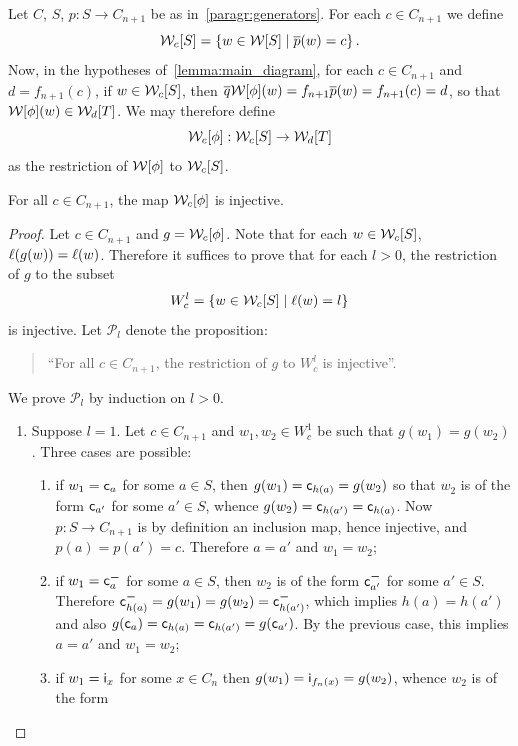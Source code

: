 \begin{paragr}\label{paragr:restricted_formulas}
  Let $C$, $S$, $p:S\to C_{n+1}$ be as in~\ref{paragr:generators}. For
  each $c\in C_{n+1}$ we define
  \[\mathcal{W}_{c}[S]=\left\{ w\in\mathcal{W}[S]\; | \; \overline{p}(w)=c\right\}.\]
  Now, in the hypotheses of~\cref{lemma:main_diagram}, for each $c\in
  C_{n+1}$ and $d=f_{n+1}(c)$, if $w\in\mathcal{W}_{c}[S]$, then $\overline{q}\mathcal{W}[\phi](w)=f_{n+1}\overline{p}(w)=f_{n+1}(c)=d$, so that
  $\mathcal{W}[\phi](w)\in\mathcal{W}_{d}[T]$. We may therefore define
  \[\mathcal{W}_{c}[\phi]:\mathcal{W}_{c}[S]\to \mathcal{W}_{d}[T]\]
  as the restriction of $\mathcal{W}[\phi]$ to $\mathcal{W}_{c}[S]$. 
\end{paragr}
\begin{lemma}\label{lemma:injectivity}
  For all $c\in C_{n+1}$, the map
  $\mathcal{W}_{c}[\phi]$ is injective.
\end{lemma}
\begin{proof}
  Let $c\in C_{n+1}$ and $g=\mathcal{W}_{c}[\phi]$. Note that for each $w\in\mathcal{W}_{c}[S]$, $\ell(g(w))=\ell(w)$. Therefore it suffices to prove that for
  each $l>0$, the restriction of $g$ to the subset
  \[W^l_c=\left\{ w\in\mathcal{W}_{c}[S]\; | \; \ell(w)=l\right\}\]
  is injective. Let $\mathcal{P}_l$ denote the proposition:
  \begin{quote}
   ``For all $c\in C_{n+1}$, the restriction of $g$ to
    $W^l_c$ is injective''.
  \end{quote}
  We prove $\mathcal{P}_l$ by induction on $l>0$.
  \begin{enumerate}
  \item Suppose $l=1$. Let $c\in C_{n+1}$ and $w_1,w_2\in W^1_c$ be such that
    $g(w_1)=g(w_2)$. Three cases are possible:
    \begin{enumerate}
    \item if $w_1=\mathsf{c}_{a}$ for some $a\in S$, then
      $g(w_1)=\mathsf{c}_{h(a)}=g(w_2)$ so that $w_2$ is of the form
      $\mathsf{c}_{a'}$ for some $a'\in S$, whence
      $g(w_2)=\mathsf{c}_{h(a')}=\mathsf{c}_{h(a)}$. Now $p:S\to C_{n+1}$ is by
      definition an inclusion map, hence injective, and
      $p(a)=p(a')=c$. Therefore $a=a'$ and $w_1=w_2$;
    \item if $w_1=\mathsf{c}^{\boldsymbol{-}}_{a}$ for some $a\in S$, then $w_2$ is of the
      form $\mathsf{c}^{\boldsymbol{-}}_{a'}$ for some $a'\in S$. Therefore
      $\mathsf{c}^{\boldsymbol{-}}_{h(a)}=g(w_1)=g(w_2)=\mathsf{c}^{\boldsymbol{-}}_{h(a')}$, which implies
      $h(a)=h(a')$ and also
      $g(\mathsf{c}_{a})=\mathsf{c}_{h(a)}=\mathsf{c}_{h(a')}=g(\mathsf{c}_{a'})$. By the
      previous case, this implies $a=a'$ and $w_1=w_2$;
      \item if $w_1=\mathsf{i}_{x}$ for some $x\in C_n$ then
      $g(w_1)=\mathsf{i}_{f_n(x)}=g(w_2)$, whence $w_2$ is of the form

\end{enumerate}
\end{enumerate}
\end{proof}
